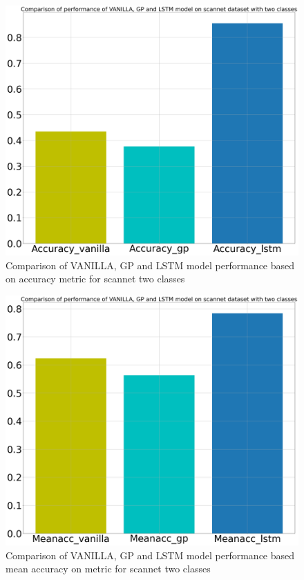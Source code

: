 
	\begin{figure}
		\centering
		\includegraphics[width=12cm]{images/two_classes_acc.png}
		\caption{Comparison of VANILLA, GP and LSTM model performance based on accuracy metric for scannet two classes}
		\label{fig:unet_model_metric_comparison}
	\end{figure}

	\begin{figure}
		\centering
		\includegraphics[width=12cm]{images/two_classes_meanacc.png}
		\caption{Comparison of VANILLA, GP and LSTM model performance based mean accuracy on metric for scannet two classes}
		\label{fig:unet_model_metric_comparison}
	\end{figure}

